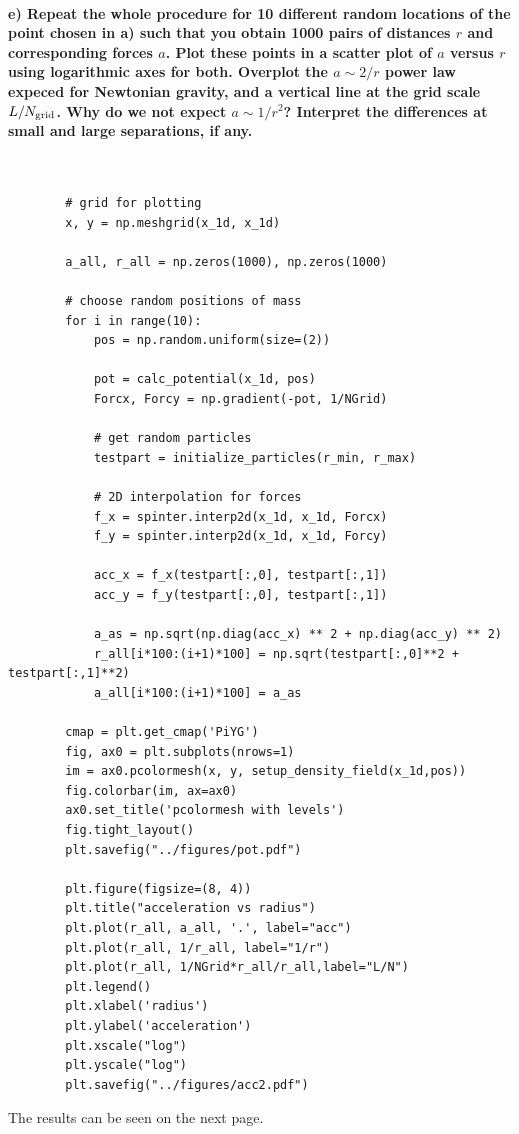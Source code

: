 \newpage
\paragraph{e) Repeat the whole procedure for 10 different random locations of 
    the point chosen in a) such that you obtain 1000 pairs of distances $r$ and 
    corresponding forces $a$. Plot these points in a scatter plot of $a$ versus
    $r$ using logarithmic axes for both. Overplot the $a\sim2/r$ power law 
    expeced for Newtonian gravity, and a vertical line at the grid scale 
    $L/N_\textnormal{grid}$. Why do we not expect $a\sim1/r^2$? Interpret the 
    differences at small and large separations, if any.
} \ \\
    \begin{lstlisting}
        # grid for plotting
        x, y = np.meshgrid(x_1d, x_1d)

        a_all, r_all = np.zeros(1000), np.zeros(1000)

        # choose random positions of mass
        for i in range(10):
            pos = np.random.uniform(size=(2))

            pot = calc_potential(x_1d, pos)
            Forcx, Forcy = np.gradient(-pot, 1/NGrid)

            # get random particles
            testpart = initialize_particles(r_min, r_max)

            # 2D interpolation for forces
            f_x = spinter.interp2d(x_1d, x_1d, Forcx)
            f_y = spinter.interp2d(x_1d, x_1d, Forcy)
        
            acc_x = f_x(testpart[:,0], testpart[:,1])
            acc_y = f_y(testpart[:,0], testpart[:,1])

            a_as = np.sqrt(np.diag(acc_x) ** 2 + np.diag(acc_y) ** 2)
            r_all[i*100:(i+1)*100] = np.sqrt(testpart[:,0]**2 + testpart[:,1]**2)
            a_all[i*100:(i+1)*100] = a_as
        
        cmap = plt.get_cmap('PiYG')
        fig, ax0 = plt.subplots(nrows=1)
        im = ax0.pcolormesh(x, y, setup_density_field(x_1d,pos))
        fig.colorbar(im, ax=ax0)
        ax0.set_title('pcolormesh with levels')
        fig.tight_layout()
        plt.savefig("../figures/pot.pdf")

        plt.figure(figsize=(8, 4))
        plt.title("acceleration vs radius")
        plt.plot(r_all, a_all, '.', label="acc")
        plt.plot(r_all, 1/r_all, label="1/r")
        plt.plot(r_all, 1/NGrid*r_all/r_all,label="L/N")
        plt.legend()
        plt.xlabel('radius')
        plt.ylabel('acceleration')
        plt.xscale("log")
        plt.yscale("log")
        plt.savefig("../figures/acc2.pdf")\end{lstlisting}
        The results can be seen on the next page.

